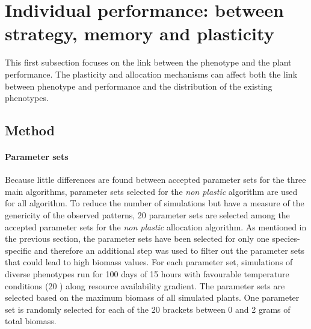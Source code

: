 \section{Individual performance: between strategy, memory and plasticity}\label{section:landscape}

This first subsection focuses on the link between the phenotype and the plant performance. The plasticity and allocation mechanisms can affect both the link between phenotype and performance and the distribution of the existing phenotypes.



\subsection{Method}

\paragraph{Parameter sets}
Because little differences are found between accepted parameter sets for the three main algorithms, parameter sets selected for the \textit{non plastic} algorithm are used for all algorithm. To reduce the number of simulations but have a measure of the genericity of the observed patterns, 20 parameter sets are selected among the accepted parameter sets for the \textit{non plastic} allocation algorithm. As mentioned in the previous section, the parameter sets have been selected for only one species-specific and therefore an additional step was used to filter out the parameter sets that could lead to high biomass values. For each parameter set, simulations of diverse phenotypes run for 100 days of 15 hours with favourable temperature conditions (20 \celsius) along resource availability gradient. The parameter sets are selected based on the maximum biomass of all simulated plants. One parameter set is randomly selected for each of the 20 brackets between 0 and 2 grams of total biomass.

